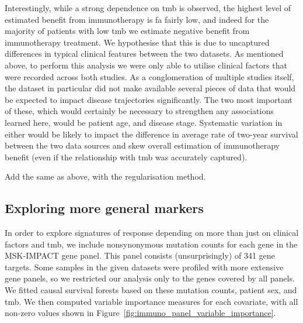 \documentclass[../thesis.tex]{subfiles}
\begin{document}
Interestingly, while a strong dependence on \gls{tmb} is observed, the highest level of estimated benefit from immunotherapy is fa
fairly low, and indeed for the majority of patients with low \gls{tmb} we estimate negative benefit from immunotherapy treatment. We hypothesise that this is due to uncaptured differences in typical clinical features between the two datasets. As mentioned above, to perform this analysis we were only able to utilise clinical factors that were recorded across both studies. As a conglomeration of multiple studies itself, the \citet{zehir_mutational_2017} dataset in particular did not make available several pieces of data that would be expected to impact disease trajectories significantly. The two most important of these, which would certainly be necessary to strengthen any associations learned here, would be patient age, and disease stage. Systematic variation in either would be likely to impact the difference in average rate of two-year survival between the two data sources and skew overall estimation of immunotherapy benefit (even if the relationship with \gls{tmb} was accurately captured).


{\color{red} Add the same as above, with the regularisation method.}

\subsection{Exploring more general markers}
In order to explore signatures of response depending on more than just on clinical factors and \gls{tmb}, we include nonsynonymous mutation counts for each gene in the MSK-IMPACT gene panel. This panel consists (unsurprisingly) of 341 gene targets. Some samples in the given datasets were profiled with more extensive gene panels, so we restricted our analysis only to the genes covered by all panels. We fitted causal survival forests based on these mutation counts, patient sex, and \gls{tmb}. We then computed variable importance measures for each covariate, with all non-zero values shown in Figure~\ref{fig:immuno_panel_variable_importance}. 
\end{document}

